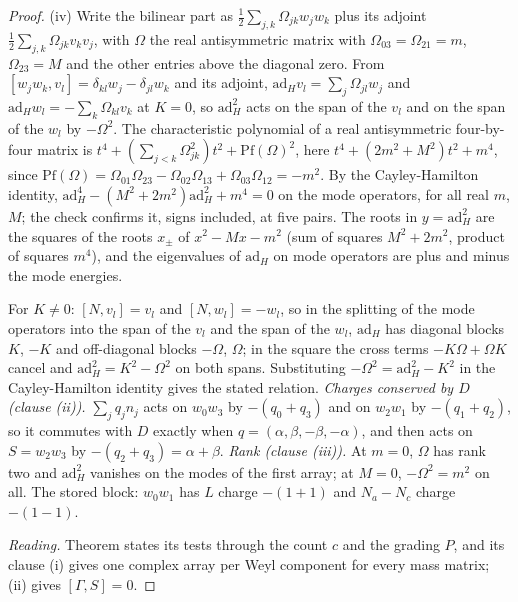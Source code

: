 \begin{proof}
(iv) Write the bilinear part as $\tfrac12\sum_{j,k}\Omega_{jk}w_{j}w_{k}$ plus its adjoint $\tfrac12\sum_{j,k}\Omega_{jk}v_{k}v_{j}$, with $\Omega$ the real antisymmetric matrix with $\Omega_{03} = \Omega_{21} = m$, $\Omega_{23} = M$ and the other entries above the diagonal zero. From $[w_{j}w_{k}, v_{l}] = \delta_{kl}w_{j} - \delta_{jl}w_{k}$ and its adjoint, $\mathrm{ad}_{H}v_{l} = \sum_{j}\Omega_{jl}w_{j}$ and $\mathrm{ad}_{H}w_{l} = -\sum_{k}\Omega_{kl}v_{k}$ at $K = 0$, so $\mathrm{ad}_{H}^{2}$ acts on the span of the $v_{l}$ and on the span of the $w_{l}$ by $-\Omega^{2}$. The characteristic polynomial of a real antisymmetric four-by-four matrix is $t^{4} + (\sum_{j<k}\Omega_{jk}^{2})t^{2} + \mathrm{Pf}(\Omega)^{2}$, here $t^{4} + (2m^{2} + M^{2})t^{2} + m^{4}$, since $\mathrm{Pf}(\Omega) = \Omega_{01}\Omega_{23} - \Omega_{02}\Omega_{13} + \Omega_{03}\Omega_{12} = -m^{2}$. By the Cayley-Hamilton identity, $\mathrm{ad}_{H}^{4} - (M^{2} + 2m^{2})\mathrm{ad}_{H}^{2} + m^{4} = 0$ on the mode operators, for all real $m$, $M$; the check confirms it, signs included, at five pairs. The roots in $y = \mathrm{ad}_{H}^{2}$ are the squares of the roots $x_{\pm}$ of $x^{2} - Mx - m^{2}$ (sum of squares $M^{2} + 2m^{2}$, product of squares $m^{4}$), and the eigenvalues of $\mathrm{ad}_{H}$ on mode operators are plus and minus the mode energies.

For $K \neq 0$: $[N, v_{l}] = v_{l}$ and $[N, w_{l}] = -w_{l}$, so in the splitting of the mode operators into the span of the $v_{l}$ and the span of the $w_{l}$, $\mathrm{ad}_{H}$ has diagonal blocks $K$, $-K$ and off-diagonal blocks $-\Omega$, $\Omega$; in the square the cross terms $-K\Omega + \Omega K$ cancel and $\mathrm{ad}_{H}^{2} = K^{2} - \Omega^{2}$ on both spans. Substituting $-\Omega^{2} = \mathrm{ad}_{H}^{2} - K^{2}$ in the Cayley-Hamilton identity gives the stated relation. \emph{Charges conserved by $D$ (clause (ii)).} $\sum_{j}q_{j}n_{j}$ acts on $w_{0}w_{3}$ by $-(q_{0} + q_{3})$ and on $w_{2}w_{1}$ by $-(q_{1} + q_{2})$, so it commutes with $D$ exactly when $q = (\alpha, \beta, -\beta, -\alpha)$, and then acts on $S = w_{2}w_{3}$ by $-(q_{2} + q_{3}) = \alpha + \beta$. \emph{Rank (clause (iii)).} At $m = 0$, $\Omega$ has rank two and $\mathrm{ad}_{H}^{2}$ vanishes on the modes of the first array; at $M = 0$, $-\Omega^{2} = m^{2}$ on all. The stored block: $w_{0}w_{1}$ has $L$ charge $-(1 + 1)$ and $N_{a} - N_{c}$ charge $-(1 - 1)$.

\emph{Reading.} Theorem  states its tests through the count $c$ and the grading $P$, and its clause (i) gives one complex array per Weyl component for every mass matrix; (ii) gives $[\Gamma, S] = 0$.
\end{proof}
